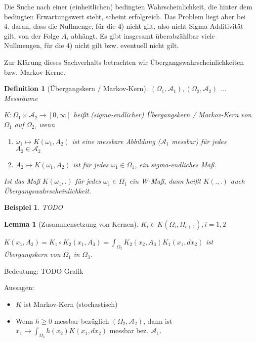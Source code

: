 \documentclass[]{article}
\newtheorem{lemma}{Lemma}
\newtheorem{definition}{Definition}
\newtheorem*{example}{Beispiel}
\begin{document}
Die Suche nach einer (einheitlichen) bedingten Wahrscheinlichkeit, die hinter dem bedingten Erwartungswert steht, scheint erfolgreich. Das Problem liegt aber bei 4. daran, dass die Nullmenge, für die 4) nicht gilt, also nicht Sigma-Additivität gilt, von der Folge $A_i$ abhängt. Es gibt insgesamt überabzählbar viele Nullmengen, für die 4) nicht gilt bzw. eventuell nicht gilt.

Zur Klärung dieses Sachverhalts betrachten wir Übergangswahrscheinlichkeiten bzw. Markov-Kerne.

\begin{definition}[Übergangskern / Markov-Kern]
	$(\Omega_1, \mathcal{A}_1), (\Omega_2, \mathcal{A}_2)$ ... Messräume
	
	$K:\Omega_1 \times \mathcal{A}_2 \rightarrow [0, \infty]$ heißt (sigma-endlicher) Übergangskern / Markov-Kern von $\Omega_1$ auf $\Omega_2$, wenn
	\begin{enumerate}
		\item $\omega_1\mapsto K(\omega_1, A_2)$ ist eine messbare Abbildung ($\mathcal{A}_1$ messbar) für jedes $A_2 \in \mathcal{A}_2$
		\item $A_2 \mapsto K(\omega_1, A_2)$ ist für jedes $\omega_1 \in \Omega_1$, ein sigma-endliches Maß.
	\end{enumerate}

	Ist das Maß $K(\omega_1, .)$ für jedes $\omega_1 \in \Omega_1$ ein W-Maß, dann heißt $K(.,.)$ auch Übergangswahrscheinlichkeit.
\end{definition}

\begin{example}
	TODO
\end{example}

\begin{lemma}[Zusammensetzung von Kernen]
	$K_i \in K(\Omega_i, \Omega_{i+1}), i=1,2$
	
	$K(x_1, A_3) = K_1 \circ K_2(x_1, A_3) = \int_{\Omega_2} K_2(x_2, A_3) K_1(x_1, dx_2)$ ist Übergangskern von $\Omega_1$ in $\Omega_3$.
\end{lemma}

Bedeutung: TODO Grafik

Aussagen:
\begin{itemize}
	\item $K$ ist Markov-Kern (stochastisch)
	\item Wenn $h\geq 0$ messbar bezüglich $(\Omega_2, \mathcal{A}_2)$, dann ist $x_1 \rightarrow \int_{\Omega_2} h(x_2) K(x_1, dx_2)$ messbar bez. $\mathcal{A}_1$.
\end{itemize}
\end{document}
